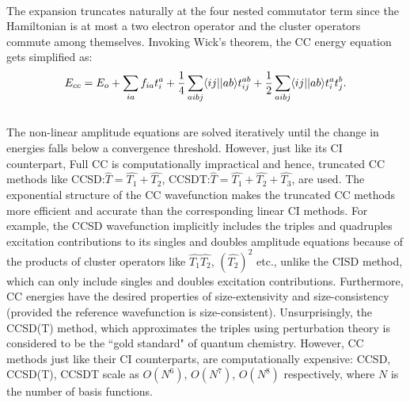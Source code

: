 \\
The expansion truncates naturally at the four nested commutator term since the Hamiltonian is at most a two 
electron operator and the cluster operators commute among themselves\cite{Crawford00}.
Invoking Wick's theorem\cite{Wick50}, the CC energy equation gets simplified as:
\\
\begin{equation}
E_{cc} = E_o + \sum_{ia}f_{ia}t^a_i + \frac{1}{4}\sum_{aibj}\langle ij || ab \rangle t^{ab}_{ij} + \frac{1}{2}\sum_{aibj}\langle ij || ab \rangle t^a_it^b_j.
\end{equation} 
\\
The non-linear amplitude equations are solved iteratively until the change in energies
falls below a convergence threshold. However, just like its CI counterpart, Full CC is 
computationally impractical and hence, truncated CC methods like CCSD:\;$\hat{T} =
\hat{T_1} + \hat{T_2}$, CCSDT:\;$\hat{T} = \hat{T_1} + \hat{T_2} + \hat{T_3}$, 
are used. The exponential structure of the CC wavefunction makes the truncated CC methods 
more efficient and accurate than the corresponding linear CI methods. For example,
the CCSD wavefunction implicitly includes the triples and quadruples excitation contributions to 
its singles and doubles amplitude equations because of the products of cluster operators like 
$\hat{T_1}\hat{T_2}$, ${(\hat{T_2})}^2$ etc., unlike the CISD method, which can only include 
singles and doubles excitation contributions. Furthermore, CC energies have the desired 
properties of size-extensivity and size-consistency (provided the reference wavefunction is
size-consistent). Unsurprisingly, the CCSD(T)\cite{Shen12} method, which approximates the triples using
perturbation theory is considered to be the ``gold standard" of quantum chemistry.
However, CC methods just like their CI counterparts, are computationally expensive: 
CCSD, CCSD(T), CCSDT scale as $O(N^6)$, $O(N^7)$, $O(N^8)$ respectively, where $N$ 
is the number of basis functions.\\
